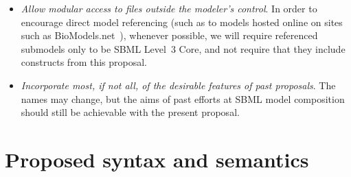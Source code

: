 \begin{itemize}
\item \emph{Allow modular access to files outside the modeler's
    control}.  In order to encourage direct model referencing (such as
  to models hosted online on sites such as BioModels.net~\cite{}),
  whenever possible, we will require referenced submodels only to be
  SBML Level~3 Core, and not require that they include constructs from
  this proposal.

\item \emph{Incorporate most, if not all, of the desirable features of
    past proposals}. The names may change, but the aims of past efforts
  at SBML model composition should still be achievable with the present
  proposal.

\end{itemize}


\section{Proposed syntax and semantics}
